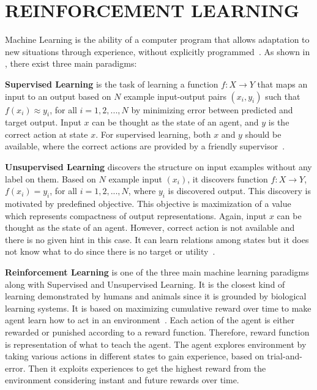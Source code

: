 \chapter{REINFORCEMENT LEARNING}
\label{chap:rl_chap}

Machine Learning is the ability of a computer program that allows 
adaptation to new situations through experience, 
without explicitly programmed~\cite{mitchell_machine_1997}. 
As shown in , there exist three main paradigms: 

\textbf{Supervised Learning} is the task of learning a function $f \colon X \rightarrow Y$ 
that maps an input to an output based on $N$ example input-output pairs $(x_i,y_i)$ 
such that $ f(x_i) \approx y_i$, for all $i={1,2,...,N}$ 
by minimizing error between predicted and target output. 
Input $x$ can be thought as the state of an agent, and $y$ is the correct action at state $x$. 
For supervised learning, both $x$ and $y$ should be available, 
where the correct actions are provided by a friendly supervisor~\cite{russell_artificial_nodate}. 

\textbf{Unsupervised Learning} discovers the structure on input examples without any label on them. 
Based on $N$ example input $(x_i)$, 
it discovers function $f \colon X \rightarrow Y$, $ f(x_i) = y_i$, for all $i={1,2,...,N} $, 
where $y_i$ is discovered output. 
This discovery is motivated by predefined objective. 
This objective is maximization of a value which represents compactness of output representations. 
Again, input $x$ can be thought as the state of an agent. 
However, correct action is not available and there is no given hint in this case. 
It can learn relations among states but it does not know what to do 
since there is no target or utility~\cite{russell_artificial_nodate}.
 
\textbf{Reinforcement Learning} is one of the three main machine learning paradigms along with Supervised and Unsupervised Learning. 
It is the closest kind of learning demonstrated by humans and animals 
since it is grounded by biological learning systems. 
It is based on maximizing cumulative reward over time to make agent 
learn how to act in an environment~\cite{sutton_reinforcement_1998}. 
Each action of the agent is either rewarded or punished according to a reward function. 
Therefore, reward function is representation of what to teach the agent. 
The agent explores environment by taking various actions in different states to gain experience, based on trial-and-error. 
Then it exploits experiences to get the highest reward from the environment considering instant and future rewards over time. 

